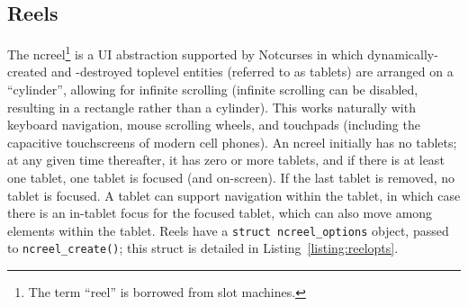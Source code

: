 \documentclass[letterpaper,10pt]{article}
\begin{document}
\subsection{Reels}
The ncreel\footnote{The term ``reel'' is borrowed from slot machines.} is a UI abstraction supported by Notcurses in which
dynamically-created and -destroyed toplevel entities (referred to as tablets)
are arranged on a ``cylinder'', allowing for infinite scrolling
(infinite scrolling can be disabled, resulting in a rectangle rather than a
cylinder). This works naturally with keyboard navigation, mouse scrolling wheels,
and touchpads (including the capacitive touchscreens of modern cell phones).
An ncreel initially has no tablets; at any given time thereafter, it has zero
or more tablets, and if there is at least one tablet, one tablet is focused
(and on-screen). If the last tablet is removed, no tablet is focused. A tablet
can support navigation within the tablet, in which case there is an in-tablet
focus for the focused tablet, which can also move among elements within the
tablet. Reels have a \texttt{struct ncreel\_options} object, passed to
\texttt{ncreel\_create()}; this struct is detailed in Listing~\ref{listing:reelopts}.
\end{document}
